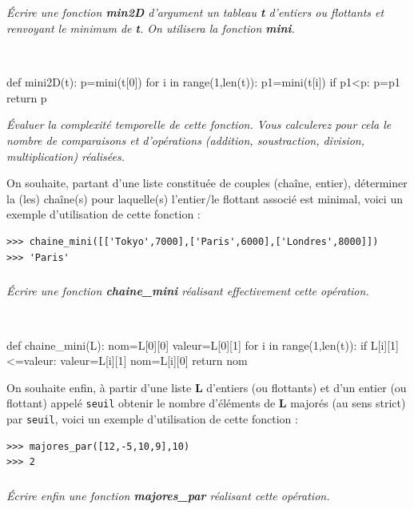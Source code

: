 \documentclass[10pt,fleqn]{article} %
\begin{document}
\subparagraph{}
\textit{Écrire une fonction \textbf{min2D} d'argument un tableau \textbf{t} d'entiers ou flottants 
et renvoyant le minimum de \textbf{t}. On utilisera la fonction \textbf{mini}.}

\ifprof
\begin{corrige}~\
\begin{python}
def mini2D(t):
    p=mini(t[0])
    for i in range(1,len(t)):
        p1=mini(t[i])
        if p1<p:
            p=p1
    return p
\end{python}
\end{corrige}
\else
\fi

\textit{Évaluer la complexité temporelle de cette fonction.
Vous calculerez pour cela le nombre de comparaisons et d'opérations (addition, soustraction, division, multiplication) réalisées.}
  
On souhaite, partant d'une liste constituée de couples
  (chaîne, entier), déterminer la (les) chaîne(s) pour laquelle(s) l'entier/le flottant 
  associé est minimal, voici un exemple d'utilisation de cette fonction :
\begin{py}
\begin{lstlisting}
>>> chaine_mini([['Tokyo',7000],['Paris',6000],['Londres',8000]]) 
>>> 'Paris'
\end{lstlisting}
\end{py}
\subparagraph{}
\textit{Écrire une fonction \textbf{chaine\_mini} réalisant effectivement cette opération.}


\ifprof
\begin{corrige}~\
\begin{python}
def chaine_mini(L):
    nom=L[0][0]
    valeur=L[0][1]
    for i in range(1,len(t)):
        if L[i][1]<=valeur:
            valeur=L[i][1]
            nom=L[i][0]
    return nom
\end{python}
\end{corrige}
\else
\fi



On souhaite enfin, à partir d'une liste \textbf{L}
 d'entiers (ou flottants) et d'un entier (ou flottant) appelé \texttt{seuil} obtenir le nombre 
 d'éléments de \textbf{L} majorés (au sens strict) par \texttt{seuil}, voici un exemple d'utilisation de cette fonction : 
 \begin{py}
\begin{lstlisting}
>>> majores_par([12,-5,10,9],10)
>>> 2
\end{lstlisting}
\end{py}
\subparagraph{} 
\textit{Écrire enfin une fonction \textbf{majores\_par} réalisant cette opération.}
\end{document}
